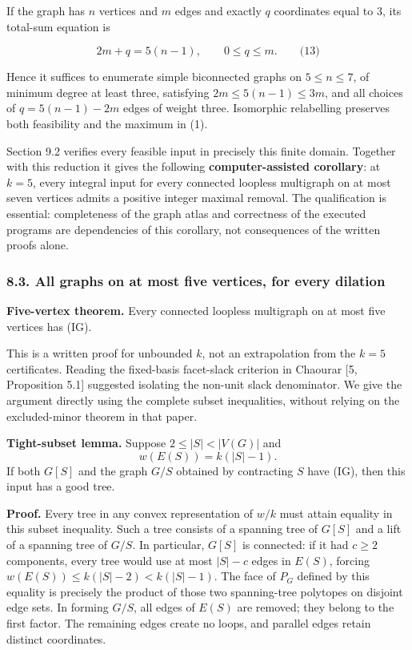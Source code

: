 \documentclass{article}
\begin{document}
If the graph has \(n\) vertices and \(m\) edges and exactly \(q\) coordinates equal to \(3\), its total-sum equation is

\[
2m+q=5(n-1),\qquad 0\le q\le m.\qquad\text{(13)}
\]

Hence it suffices to enumerate simple biconnected graphs on \(5\le n\le7\), of minimum degree at least three, satisfying \(2m\le5(n-1)\le3m\), and all choices of \(q=5(n-1)-2m\) edges of weight three. Isomorphic relabelling preserves both feasibility and the maximum in (1).

Section 9.2 verifies every feasible input in precisely this finite domain. Together with this reduction it gives the following \textbf{computer-assisted corollary}: at \(k=5\), every integral input for every connected loopless multigraph on at most seven vertices admits a positive integer maximal removal. The qualification is essential: completeness of the graph atlas and correctness of the executed programs are dependencies of this corollary, not consequences of the written proofs alone.

\subsubsection{8.3. All graphs on at most five vertices, for every dilation}

\textbf{Five-vertex theorem.} Every connected loopless multigraph on at most five vertices has (IG).

This is a written proof for unbounded \(k\), not an extrapolation from the \(k=5\) certificates. Reading the fixed-basis facet-slack criterion in Chaourar [5, Proposition 5.1] suggested isolating the non-unit slack denominator. We give the argument directly using the complete subset inequalities, without relying on the excluded-minor theorem in that paper.

\textbf{Tight-subset lemma.} Suppose \(2\le |S|\lt |V(G)|\) and \[
w(E(S))=k(|S|-1).
\] If both \(G[S]\) and the graph \(G/S\) obtained by contracting \(S\) have (IG), then this input has a good tree.

\textbf{Proof.} Every tree in any convex representation of \(w/k\) must attain equality in this subset inequality. Such a tree consists of a spanning tree of \(G[S]\) and a lift of a spanning tree of \(G/S\). In particular, \(G[S]\) is connected: if it had \(c\ge2\) components, every tree would use at most \(|S|-c\) edges in \(E(S)\), forcing \(w(E(S))\le k(|S|-2)\lt k(|S|-1)\). The face of \(P_G\) defined by this equality is precisely the product of those two spanning-tree polytopes on disjoint edge sets. In forming \(G/S\), all edges of \(E(S)\) are removed; they belong to the first factor. The remaining edges create no loops, and parallel edges retain distinct coordinates.
\end{document}
